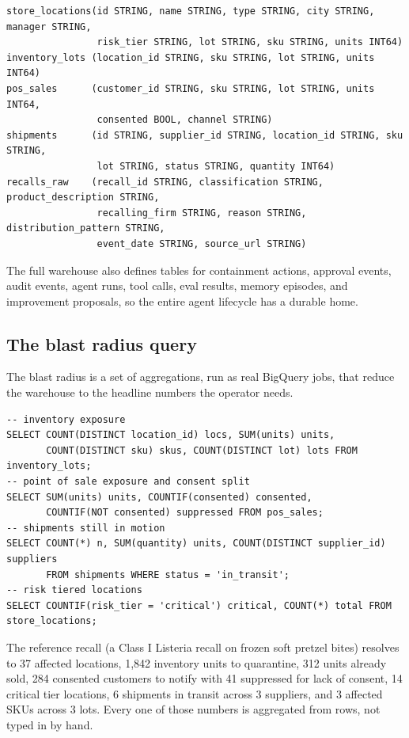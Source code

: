 \documentclass[11pt]{article}
\begin{document}
\begin{lstlisting}[style=sql,caption={Core warehouse table definitions (backend/app/bigquery.py).}]
store_locations(id STRING, name STRING, type STRING, city STRING, manager STRING,
                risk_tier STRING, lot STRING, sku STRING, units INT64)
inventory_lots (location_id STRING, sku STRING, lot STRING, units INT64)
pos_sales      (customer_id STRING, sku STRING, lot STRING, units INT64,
                consented BOOL, channel STRING)
shipments      (id STRING, supplier_id STRING, location_id STRING, sku STRING,
                lot STRING, status STRING, quantity INT64)
recalls_raw    (recall_id STRING, classification STRING, product_description STRING,
                recalling_firm STRING, reason STRING, distribution_pattern STRING,
                event_date STRING, source_url STRING)
\end{lstlisting}

The full warehouse also defines tables for containment actions, approval events, audit events,
agent runs, tool calls, eval results, memory episodes, and improvement proposals, so the entire
agent lifecycle has a durable home.

\subsection{The blast radius query}

The blast radius is a set of aggregations, run as real BigQuery jobs, that reduce the warehouse to
the headline numbers the operator needs.

\begin{lstlisting}[style=sql,caption={Blast radius aggregations (abridged).}]
-- inventory exposure
SELECT COUNT(DISTINCT location_id) locs, SUM(units) units,
       COUNT(DISTINCT sku) skus, COUNT(DISTINCT lot) lots FROM inventory_lots;
-- point of sale exposure and consent split
SELECT SUM(units) units, COUNTIF(consented) consented,
       COUNTIF(NOT consented) suppressed FROM pos_sales;
-- shipments still in motion
SELECT COUNT(*) n, SUM(quantity) units, COUNT(DISTINCT supplier_id) suppliers
       FROM shipments WHERE status = 'in_transit';
-- risk tiered locations
SELECT COUNTIF(risk_tier = 'critical') critical, COUNT(*) total FROM store_locations;
\end{lstlisting}

\begin{factbox}
The reference recall (a Class I Listeria recall on frozen soft pretzel bites) resolves to
37 affected locations, 1,842 inventory units to quarantine, 312 units already sold,
284 consented customers to notify with 41 suppressed for lack of consent, 14 critical tier
locations, 6 shipments in transit across 3 suppliers, and 3 affected SKUs across 3 lots. Every one
of those numbers is aggregated from rows, not typed in by hand.
\end{factbox}
\end{document}
